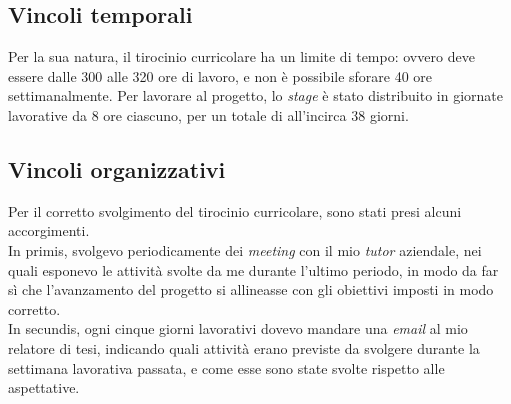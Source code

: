 \subsection{Vincoli temporali}\label{subsec:time-restrictions}\noindent
Per la sua natura, il tirocinio curricolare ha un limite di tempo: ovvero deve essere dalle 300 alle 320 ore di lavoro, e non è possibile sforare 40 ore settimanalmente.
Per lavorare al progetto, lo \textit{stage} è stato distribuito in giornate lavorative da 8 ore ciascuno, per un totale di all'incirca 38 giorni.

\subsection{Vincoli organizzativi}\noindent
Per il corretto svolgimento del tirocinio curricolare, sono stati presi alcuni accorgimenti.\\
In primis, svolgevo periodicamente dei \textit{meeting} con il mio \textit{tutor} aziendale, nei quali esponevo le attività svolte da me durante l'ultimo periodo, in modo da far sì che l'avanzamento del progetto si allineasse con gli obiettivi imposti in modo corretto.\\
In secundis, ogni cinque giorni lavorativi dovevo mandare una \textit{email} al mio relatore di tesi, indicando quali attività erano previste da svolgere durante la settimana lavorativa passata, e come esse sono state svolte rispetto alle aspettative.

